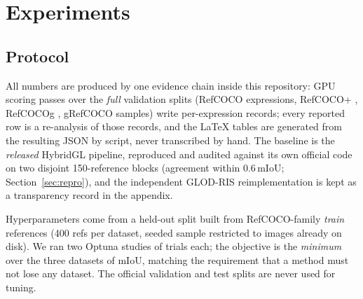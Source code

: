 \section{Experiments}
\label{sec:experiments}

\subsection{Protocol}
All numbers are produced by one evidence chain inside this repository: GPU
scoring passes over the \emph{full} validation splits (RefCOCO
 expressions, RefCOCO+ , RefCOCOg ,
gRefCOCO \grefN{} samples) write per-expression records; every reported row is
a re-analysis of those records, and the LaTeX tables are generated from the
resulting JSON by script, never transcribed by hand. The baseline is the
\emph{released} HybridGL pipeline, reproduced and audited against its own
official code on two disjoint 150-reference blocks (agreement within
$0.6$\,mIoU; Section~\ref{sec:repro}), and the independent GLOD-RIS
reimplementation is kept as a transparency record in the appendix.

Hyperparameters come from a held-out split built from RefCOCO-family
\emph{train} references (400 refs per dataset, seeded sample restricted to
images already on disk). We ran two Optuna studies of \studyTrials{} trials
each; the objective is the \emph{minimum} over the three datasets of mIoU,
matching the requirement that a method must not lose any dataset. The official
validation and test splits are never used for tuning.


